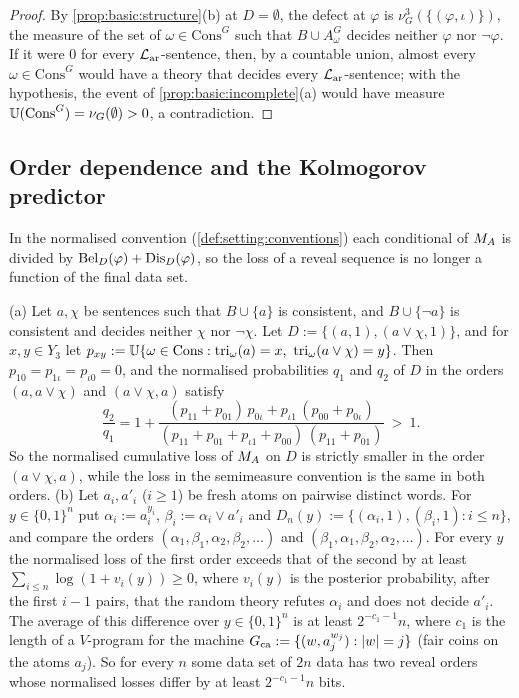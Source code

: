 \begin{proof}
By \cref{prop:basic:structure}(b) at $D=\emptyset$, the defect at $\varphi$ is $\nu^3_G(\{(\varphi,\iota)\})$, the measure of the set of $\omega\in\mathrm{Cons}^G$ such that $B\cup A^G_\omega$ decides neither $\varphi$ nor $\neg\varphi$. If it were $0$ for every $\mathcal{L}_{\mathrm{ar}}$-sentence, then, by a countable union, almost every $\omega\in\mathrm{Cons}^G$ would have a theory that decides every $\mathcal{L}_{\mathrm{ar}}$-sentence; with the hypothesis, the event of \cref{prop:basic:incomplete}(a) would have measure $\mathbb{U}(\mathrm{Cons}^G)=\nu_G(\emptyset)>0$, a contradiction.
\end{proof}

\subsection{Order dependence and the Kolmogorov predictor}\label{app:basic:order}

In the normalised convention (\cref{def:setting:conventions}) each conditional of $M_{A}$ is divided by $\mathrm{Bel}_D(\varphi)+\mathrm{Dis}_D(\varphi)$, so the loss of a reveal sequence is no longer a function of the final data set.

\begin{theorem}\label{thm:basic:order}
(a) Let $a,\chi$ be sentences such that $B\cup\{a\}$ is consistent, and $B\cup\{\neg a\}$ is consistent and decides neither $\chi$ nor $\neg\chi$. Let $D:=\{(a,1),(a\vee\chi,1)\}$, and for $x,y\in Y_3$ let $p_{xy}:=\Unif\{\omega\in\mathrm{Cons}:\tri_\omega(a)=x,\ \tri_\omega(a\vee\chi)=y\}$. Then $p_{10}=p_{1\iota}=p_{\iota0}=0$, and the normalised probabilities $q_1$ and $q_2$ of $D$ in the orders $(a,a\vee\chi)$ and $(a\vee\chi,a)$ satisfy
\[
\frac{q_2}{q_1}=1+\frac{(p_{11}+p_{01})\,p_{0\iota}+p_{\iota1}\,(p_{00}+p_{0\iota})}{(p_{11}+p_{01}+p_{\iota1}+p_{00})\,(p_{11}+p_{01})}\ >\ 1 .
\]
So the normalised cumulative loss of $M_{A}$ on $D$ is strictly smaller in the order $(a\vee\chi,a)$, while the loss in the semimeasure convention is the same in both orders.
(b) Let $a_i,a'_i$ ($i\ge1$) be fresh atoms on pairwise distinct words. For $y\in\{0,1\}^n$ put $\alpha_i:=a_i^{y_i}$, $\beta_i:=\alpha_i\vee a'_i$ and $D_n(y):=\{(\alpha_i,1),(\beta_i,1):i\le n\}$, and compare the orders $(\alpha_1,\beta_1,\alpha_2,\beta_2,\dots)$ and $(\beta_1,\alpha_1,\beta_2,\alpha_2,\dots)$. For every $y$ the normalised loss of the first order exceeds that of the second by at least $\sum_{i\le n}\log(1+v_i(y))\ge0$, where $v_i(y)$ is the posterior probability, after the first $i-1$ pairs, that the random theory refutes $\alpha_i$ and does not decide $a'_i$. The average of this difference over $y\in\{0,1\}^n$ is at least $2^{-c_1-1}n$, where $c_1$ is the length of a $V$-program for the machine $G_{\rm ca}:=\{(w,a_j^{w_j}):\lvert w\rvert=j\}$ (fair coins on the atoms $a_j$). So for every $n$ some data set of $2n$ data has two reveal orders whose normalised losses differ by at least $2^{-c_1-1}n$ bits.
\end{theorem}

